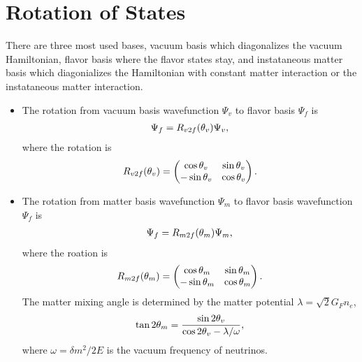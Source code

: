 \documentclass[letterpaper,12pt,english]{sphinxmanual}
\begin{document}
\section{Rotation of States}
\label{basis:rotation-of-states}
There are three most used bases, vacuum basis which diagonalizes the vacuum Hamiltonian, flavor basis where the flavor states stay, and instataneous matter basis which diagonializes the Hamiltonian with constant matter interaction or the instataneous matter interaction.
\begin{itemize}
\item {} 
The rotation from vacuum basis wavefunction \(\Psi_v\) to flavor basis \(\Psi_f\) is
\begin{gather}
\begin{split}\Psi_f = R_{v2f}(\theta_v) \Psi_v,\end{split}\notag
\end{gather}
where the rotation is
\begin{gather}
\begin{split}R_{v2f}(\theta_v) = \begin{pmatrix} \cos\theta_v & \sin \theta_v \\ -\sin \theta_v & \cos \theta_v \end{pmatrix}.\end{split}\notag
\end{gather}
\item {} 
The rotation from matter basis wavefunction \(\Psi_m\) to flavor basis wavefunction \(\Psi_f\) is
\begin{gather}
\begin{split}\Psi_f = R_{m2f}(\theta_m) \Psi_m,\end{split}\notag
\end{gather}
where the roation is
\begin{gather}
\begin{split}R_{m2f}(\theta_m) = \begin{pmatrix} \cos\theta_m & \sin \theta_m \\ -\sin \theta_m & \cos \theta_m \end{pmatrix}.\end{split}\notag
\end{gather}
The matter mixing angle is determined by the matter potential \(\lambda = \sqrt{2}G_F n_e\),
\begin{gather}
\begin{split}\tan 2\theta_m = \frac{\sin 2\theta_v}{\cos 2\theta_v - \lambda/\omega},\end{split}\notag
\end{gather}
where \(\omega = \delta m^2 /2E\) is the vacuum frequency of neutrinos.

\end{itemize}
\end{document}
